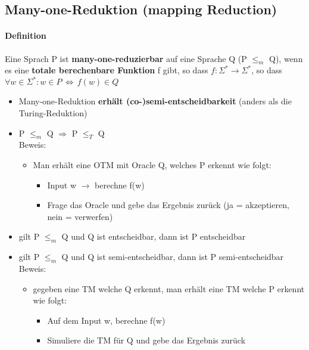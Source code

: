\documentclass[12pt,a4paper]{article}
\begin{document}
\subsection{Many-one-Reduktion (mapping Reduction)}
\paragraph{Definition}
\flushleft
Eine Sprach P ist \textbf{many-one-reduzierbar} auf eine Sprache Q (P $\leq_m$ Q), wenn es eine \textbf{totale berechenbare Funktion} f gibt, so dass $f: \Sigma^* \rightarrow \Sigma^*$, so dass\\
$\forall w\in \Sigma^*: w\in P \, \Leftrightarrow \, f(w) \in Q$\\
\begin{itemize}
\item Many-one-Reduktion \textbf{erhält (co-)semi-entscheidbarkeit} (anders als die Turing-Reduktion)
\item P $\leq_m$ Q $\Rightarrow$ P $\leq_T$ Q\\
Beweis:
\begin{itemize}
\item Man erhält eine OTM mit Oracle Q, welches P erkennt wie folgt:
\begin{itemize}
\item Input w $\rightarrow$ berechne f(w)
\item Frage das Oracle und gebe das Ergebnis zurück (ja = akzeptieren, nein = verwerfen)
\end{itemize}
\end{itemize}
\item gilt P $\leq_m$ Q und Q ist entscheidbar, dann ist P entscheidbar
\item gilt P $\leq_m$ Q und Q ist semi-entscheidbar, dann ist P semi-entscheidbar\\
Beweis:
\begin{itemize}
\item gegeben eine TM welche Q erkennt, man erhält eine TM welche P erkennt wie folgt:
\begin{itemize}
\item Auf dem Input w, berechne f(w)
\item Simuliere die TM für Q und gebe das Ergebnis zurück
\end{itemize}
\end{itemize}
\end{itemize}
\end{document}
